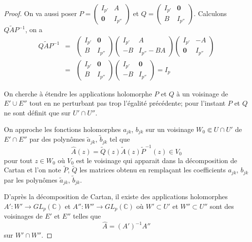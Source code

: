 \documentclass{article}
\theoremstyle{definition}
\theoremstyle{remarque}
\begin{document}
\begin{proof}
On va aussi poser $P = \begin{pmatrix}
   I_{p'} & A \\
   \mathbf{0} & I_{p''} 
\end{pmatrix}$
et $Q = \begin{pmatrix}
   I_{p'} & \mathbf{0} \\
   B & I_{p''} 
\end{pmatrix}$. Calculons $Q\tilde{A}P^{-1}$, on a
\begin{eqnarray}
\nonumber Q\tilde{A}P^{-1} &=& \begin{pmatrix}
   I_{p'} & \mathbf{0} \\
   B & I_{p''} 
\end{pmatrix}
\begin{pmatrix}
   I_{p'} & A \\
   -B & I_{p''} - BA 
\end{pmatrix}
\begin{pmatrix}
   I_{p'} & -A \\
   \mathbf{0} & I_{p''} 
\end{pmatrix} \\
\nonumber &=& \begin{pmatrix}
   I_{p'} & \mathbf{0} \\
   B & I_{p''} 
\end{pmatrix}\begin{pmatrix}
   I_{p'} & \mathbf{0} \\
   -B & I_{p''} 
\end{pmatrix} = I_p
\end{eqnarray}

On cherche à étendre les applications holomorphe $P$ et $Q$ à un voisinage de $E' \cup E''$ tout en ne perturbant pas trop l'égalité précédente; pour l'instant $P$ et $Q$ ne sont définit que sur $U' \cap U''$.

On approche les fonctions holomorphes $a_{jk}$, $b_{jk}$ sur un voisinage $W_0 \Subset U \cap U'$ de $E'\cap E''$ par des polynômes $\tilde{a}_{jk}$, $\tilde{b}_{jk}$ tel que $$\hat{A}(z) = \tilde{Q}(z)\tilde{A}(z)\tilde{P}^{-1}(z) \in V_0$$ pour tout $z \in W_0$ où $V_0$ est le voisinage qui apparait dans la décomposition de Cartan et l'on note $\tilde{P}$, $\tilde{Q}$ les matrices obtenu en remplaçant les coefficients $a_{jk}$, $b_{jk}$ par les polynômes $\tilde{a}_{jk}$, $\tilde{b}_{jk}$.

D'après la décomposition de Cartan, il existe des applications holomorphes $A' : W' \to GL_p(\mathbb{C})$ et $A'' : W'' \to GL_p(\mathbb{C})$ où $W' \subset U'$ et $W'' \subset U''$ sont des voisinages de $E'$ et $E''$ telles que $$\hat{A} = (A')^{-1}A''$$ sur $W' \cap W''$.


\end{proof}
\end{document}
